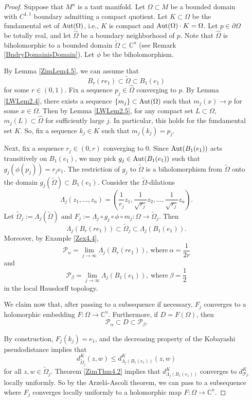 \documentclass[12pt]{article}
\newcommand{\C}{\mathbb{C}}
\newcommand{\Aut}{\textup{Aut}}
\begin{document}
\begin{proof}
Suppose that $M^n$ is a taut manifold. Let $\Omega\subset M$ be a bounded domain with $C^{1,1}$ boundary admitting a compact quotient. Let $K\subset\Omega$ be the fundamental set of $\Aut(\Omega)$, i.e., $K$ is compact and $\Aut(\Omega)\cdot K=\Omega$. Let $p\in\partial\Omega$ be totally real, and let $\widehat{\Omega}$ be a boundary neighborhood of $p$. Note that $\widehat{\Omega}$ is biholomorphic to a bounded domain $\widetilde{\Omega}\subset\C^n$ (see Remark \ref{BndryDomainisDomain}). Let $\phi$ be the biholomorphism.

By Lemma \ref{ZimLem4.5}, we can assume that 
$$B_r(re_1)\subset\widetilde{\Omega}\subset B_1(e_1)$$
for some $r\in(0,1)$. Fix a sequence $p_j\in\widehat{\Omega}$ converging to $p$. By Lemma \ref{LWLem2.4}, there exists a sequence $\{m_j\}\subset\Aut(\Omega)$ such that $m_j(x)\to p$ for some $x\in\Omega$. Then by Lemma \ref{LWLem2.5}, for any compact set $L\subset\Omega$, $m_j(L)\subset\widehat{\Omega}$ for sufficiently large $j$. In particular, this holds for the fundamental set $K$. So, fix a sequence $k_j\in K$ such that $m_j(k_j)=p_j$.

Next, fix a sequence $r_j\in(0,r)$ converging to $0$. Since $\Aut(B_1(e_1))$ acts transitively on $B_1(e_1)$, we may pick $g_j\in\Aut(B_1(e_1))$ such that $g_j(\phi(p_j))=r_je_1$. The restriction of $g_j$ to $\widetilde{\Omega}$ is a biholomorphism from $\widetilde{\Omega}$ onto the domain $g_j(\widetilde{\Omega})\subset B_1(e_1)$. Consider the $\widetilde{\Omega}$-dilations
$$\Lambda_j(z_1,\dots,z_n)=\left(\frac{1}{r_j}z_1,\frac{1}{\sqrt{r_j}}z_2,\dots,\frac{1}{\sqrt{r_j}}z_n\right).$$
Let $\widetilde{\Omega}_j:=\Lambda_j(\widetilde{\Omega})$ and $F_j:=\Lambda_j\circ g_j\circ\phi\circ m_j:\Omega\to\widetilde{\Omega}_j$. Then 
$$\Lambda_j\left(B_r(re_1)\right)\subset\widetilde{\Omega}_j\subset\Lambda_j\left(B_1(e_1)\right).$$
Moreover, by Example \ref{Zex4.4}, 
$$\mathcal{P}_{\alpha}=\lim_{j\to\infty}\Lambda_j\left(B_r(re_1)\right), \ \text{where} \ \alpha=\frac{1}{2r}$$
and 
$$\mathcal{P}_{\beta}=\lim_{j\to\infty}\Lambda_j\left(B_1(e_1)\right), \ \text{where} \ \beta=\frac{1}{2}$$
in the local Hausdorff topology.

We claim now that, after passing to a subsequence if necessary, $F_j$ converges to a holomorphic embedding $F:\Omega\to\C^n$. Furthermore, if $D=F(\Omega)$, then 
$$\mathcal{P}_{\alpha}\subset D\subset\mathcal{P}_{\beta}.$$

By construction, $F_j(k_j)=e_1$, and the decreasing property of the Kobayashi pseudodistance implies that 
$$d^K_{\widetilde{\Omega}_j}(z,w)\le d^K_{\Lambda_j\left(B_1(e_1)\right)}(z,w)$$
for all $z,w\in\widetilde{\Omega}_j$. Theorem \ref{ZimThm4.2} implies that $d^K_{\Lambda_j\left(B_1(e_1)\right)}$ converges to $d^K_{\mathcal{P}_{\beta}}$ locally uniformly. So by the Arzel\'a-Ascoli theorem, we can pass to a subsequence where $F_j$ converges locally uniformly to a holomorphic map $F:\Omega\to\C^n$. 


\end{proof}
\end{document}
